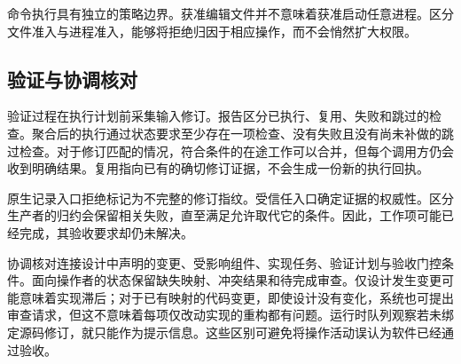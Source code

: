 命令执行具有独立的策略边界。获准编辑文件并不意味着获准启动任意进程。区分文件准入与进程准入，能够将拒绝归因于相应操作，而不会悄然扩大权限。

\subsection{验证与协调核对}
验证过程在执行计划前采集输入修订。报告区分已执行、复用、失败和跳过的检查。聚合后的执行通过状态要求至少存在一项检查、没有失败且没有尚未补做的跳过检查。对于修订匹配的情况，符合条件的在途工作可以合并，但每个调用方仍会收到明确结果。复用指向已有的确切修订证据，不会生成一份新的执行回执。

原生记录入口拒绝标记为不完整的修订指纹。受信任入口确定证据的权威性。区分生产者的归约会保留相关失败，直至满足允许取代它的条件。因此，工作项可能已经完成，其验收要求却仍未解决。

协调核对连接设计中声明的变更、受影响组件、实现任务、验证计划与验收门控条件。面向操作者的状态保留缺失映射、冲突结果和待完成审查。仅设计发生变更可能意味着实现滞后；对于已有映射的代码变更，即使设计没有变化，系统也可提出审查请求，但这不意味着每项仅改动实现的重构都有问题。运行时队列观察若未绑定源码修订，就只能作为提示信息。这些区别可避免将操作活动误认为软件已经通过验收。
